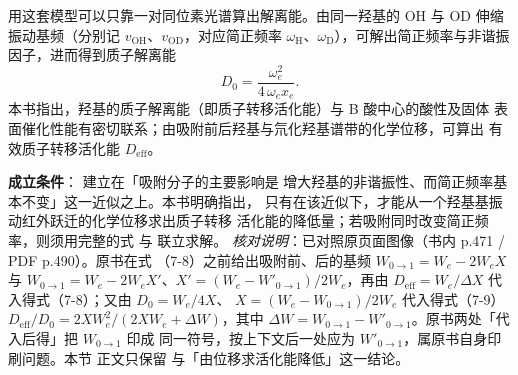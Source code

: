 \begin{principle}
用这套模型可以只靠一对同位素光谱算出解离能。由同一羟基的 OH 与 OD
伸缩振动基频（分别记 $v_{\mathrm{OH}}$、$v_{\mathrm{OD}}$，对应简正频率
$\omega_{\mathrm{H}}$、$\omega_{\mathrm{D}}$），可解出简正频率与非谐振
因子，进而得到质子解离能
\begin{equation}
  D_{0}=\frac{\omega_{e}^{2}}{4\,\omega_{e}x_{e}} .
  \label{eq:ch07b-D0}
\end{equation}
本书指出，羟基的质子解离能（即质子转移活化能）与 B 酸中心的酸性及固体
表面催化性能有密切联系；由吸附前后羟基与氘化羟基谱带的化学位移，可算出
有效质子转移活化能 $D_{\mathrm{eff}}$。

\textbf{成立条件}： 建立在「吸附分子的主要影响是
增大羟基的非谐振性、而简正频率基本不变」这一近似之上。本书明确指出，
只有在该近似下，才能从一个羟基基振动红外跃迁的化学位移求出质子转移
活化能的降低量；若吸附同时改变简正频率，则须用完整的式
 与  联立求解。
\emph{核对说明}：已对照原页面图像（书内 p.471 / PDF p.490）。原书在式
（7-8）之前给出吸附前、后的基频 $W_{0\to1}=W_{e}-2W_{e}X$ 与
$W_{0\to1}=W_{e}-2W_{e}X'$、$X'=(W_{e}-W'_{0\to1})/2W_{e}$，再由
$D_{\mathrm{eff}}=W_{e}/\Delta X$ 代入得式（7-8）；又由 $D_{0}=W_{e}/4X$、
$X=(W_{e}-W_{0\to1})/2W_{e}$ 代入得式（7-9）
$D_{\mathrm{eff}}/D_{0}=2XW_{e}^{2}/(2XW_{e}+\Delta W)$，其中
$\Delta W=W_{0\to1}-W'_{0\to1}$。原书两处「代入后得」把 $W_{0\to1}$ 印成
同一符号，按上下文后一处应为 $W'_{0\to1}$，属原书自身印刷问题。本节
正文只保留 与「由位移求活化能降低」这一结论。
\end{principle}

